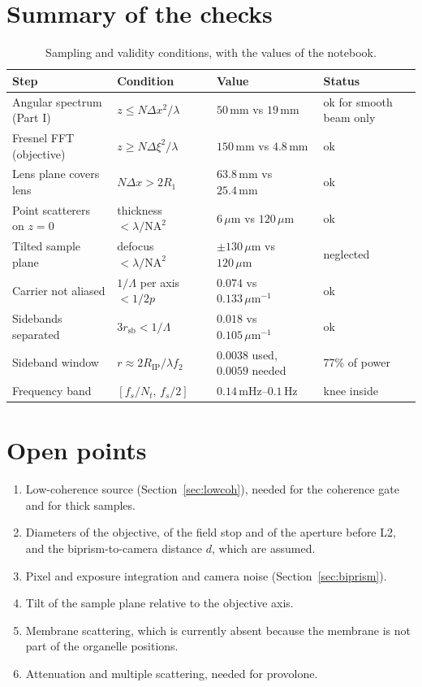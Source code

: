 \documentclass[11pt,a4paper]{article}
\newcommand{\um}{\,\mu\mathrm{m}}
\newcommand{\mm}{\,\mathrm{mm}}
\begin{document}
\section{Summary of the checks}
\label{sec:checks}

\begin{table}[ht]
\centering
\small
\caption{Sampling and validity conditions, with the values of the notebook.}
\label{tab:checks}
\begin{tabular}{@{}llll@{}}
\toprule
Step & Condition & Value & Status \\
\midrule
Angular spectrum (Part I) & $z \le N\Delta x^2/\lambda$ & $50\mm$ vs $19\mm$ & ok for smooth beam only \\
Fresnel FFT (objective) & $z \ge N\Delta\xi^2/\lambda$ & $150\mm$ vs $4.8\mm$ & ok \\
Lens plane covers lens & $N\Delta x > 2R_1$ & $63.8\mm$ vs $25.4\mm$ & ok \\
Point scatterers on $z=0$ & thickness $<\lambda/\mathrm{NA}^2$ & $6\um$ vs $120\um$ & ok \\
Tilted sample plane & defocus $<\lambda/\mathrm{NA}^2$ & $\pm130\um$ vs $120\um$ & neglected \\
Carrier not aliased & $1/\Lambda$ per axis $< 1/2p$ & $0.074$ vs $0.133\um^{-1}$ & ok \\
Sidebands separated & $3r_\mathrm{sb} < 1/\Lambda$ & $0.018$ vs $0.105\um^{-1}$ & ok \\
Sideband window & $r \approx 2R_\mathrm{IP}/\lambda f_2$ & $0.0038$ used, $0.0059$ needed & 77\% of power \\
Frequency band & $[f_s/N_t,\,f_s/2]$ & $0.14\,$mHz--$0.1\,$Hz & knee inside \\
\bottomrule
\end{tabular}
\end{table}

\section{Open points}
\label{sec:open}

\begin{enumerate}[label=(O\arabic*)]
  \item Low-coherence source (Section~\ref{sec:lowcoh}), needed for the
        coherence gate and for thick samples.
  \item Diameters of the objective, of the field stop and of the aperture
        before L2, and the biprism-to-camera distance $d$, which are assumed.
  \item Pixel and exposure integration and camera noise
        (Section~\ref{sec:biprism}).
  \item Tilt of the sample plane relative to the objective axis.
  \item Membrane scattering, which is currently absent because the membrane is
        not part of the organelle positions.
  \item Attenuation and multiple scattering, needed for provolone.
\end{enumerate}
\end{document}
